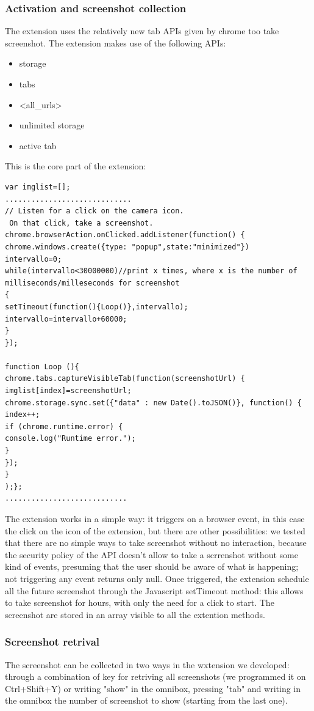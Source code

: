 \documentclass[12pt]{article}
\begin{document}
\begin{multicols}{2}
\subsubsection*{Activation and screenshot collection}
The extension uses the relatively new tab APIs given by chrome too take screenshot.
The extension makes use of the following APIs:\begin{itemize}
	\item storage
	\item tabs
	\item <all\_urls>
	\item unlimited storage
	\item active tab
	\end{itemize}
	This is the core part of the extension:
	\begin{lstlisting}
var imglist=[];
.............................
// Listen for a click on the camera icon.
 On that click, take a screenshot.
chrome.browserAction.onClicked.addListener(function() {
chrome.windows.create({type: "popup",state:"minimized"})
intervallo=0;
while(intervallo<30000000)//print x times, where x is the number of milliseconds/milleseconds for screenshot
{
setTimeout(function(){Loop()},intervallo);    
intervallo=intervallo+60000;
}
});

function Loop (){
chrome.tabs.captureVisibleTab(function(screenshotUrl) {
imglist[index]=screenshotUrl;
chrome.storage.sync.set({"data" : new Date().toJSON()}, function() {
index++;
if (chrome.runtime.error) {
console.log("Runtime error.");
}
});      
}
);};
............................
	\end{lstlisting}
	 The extension works in a simple way: it triggers on a browser event, in this case the click on the icon of the extension, but there are other possibilities: we tested that there are no simple ways to take screenshot without no interaction, because the security policy of the API doesn't allow to take a scrrenshot without some kind of events, presuming that the user should be aware of what is happening; not triggering any event returns only null.
Once triggered, the extension schedule all the future screenshot through the Javascript setTimeout method: this allows to take screenshot for hours, with only the need for a click to start.
The screenshot are stored in an array visible to all the extention methods.
\subsubsection*{Screenshot retrival}
The screenshot can be collected in two ways in the wxtension we developed:
through a combination of key for retriving all screenshots (we programmed it on Ctrl+Shift+Y) or writing "show" in the omnibox, pressing "tab" and writing in the omnibox the number of screenshot to show (starting from the last one).

\end{multicols}
\end{document}
